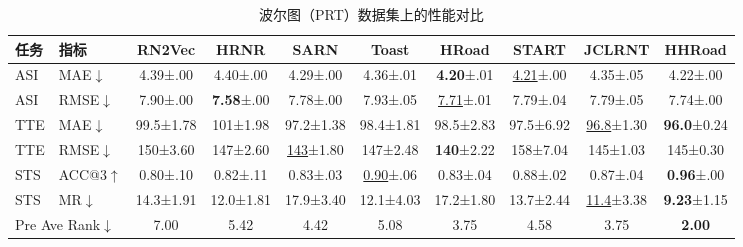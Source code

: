 \begin{table}[H]
    \centering
    \caption{波尔图（PRT）数据集上的性能对比}
    \label{tab:HHRoad_prt}
    \small
    \setlength{\tabcolsep}{3pt}
    \begin{tabular}{ll|cccccccc}
        \hline
        \textbf{任务} & \textbf{指标} & \textbf{RN2Vec} & \textbf{HRNR} & \textbf{SARN} & \textbf{Toast} & \textbf{HRoad} & \textbf{START} & \textbf{JCLRNT} & \textbf{HHRoad} \\
        \hline
        ASI & MAE$\downarrow$ & 4.39\tiny{±.00} & 4.40\tiny{±.00} & 4.29\tiny{±.00} & 4.36\tiny{±.01} & \textbf{4.20}\tiny{±.01} & \underline{4.21}\tiny{±.00} & 4.35\tiny{±.05} & 4.22\tiny{±.00} \\
        ASI & RMSE$\downarrow$ & 7.90\tiny{±.00} & \textbf{7.58}\tiny{±.00} & 7.78\tiny{±.00} & 7.93\tiny{±.05} & \underline{7.71}\tiny{±.01} & 7.79\tiny{±.04} & 7.79\tiny{±.05} & 7.74\tiny{±.00} \\
        TTE & MAE$\downarrow$ & 99.5\tiny{±1.78} & 101\tiny{±1.98} & 97.2\tiny{±1.38} & 98.4\tiny{±1.81} & 98.5\tiny{±2.83} & 97.5\tiny{±6.92} & \underline{96.8}\tiny{±1.30} & \textbf{96.0}\tiny{±0.24} \\
        TTE & RMSE$\downarrow$ & 150\tiny{±3.60} & 147\tiny{±2.60} & \underline{143}\tiny{±1.80} & 147\tiny{±2.48} & \textbf{140}\tiny{±2.22} & 158\tiny{±7.04} & 145\tiny{±1.03} & 145\tiny{±0.30} \\
        STS & ACC@3$\uparrow$ & 0.80\tiny{±.10} & 0.82\tiny{±.11} & 0.83\tiny{±.03} & \underline{0.90}\tiny{±.06} & 0.83\tiny{±.04} & 0.88\tiny{±.02} & 0.87\tiny{±.04} & \textbf{0.96}\tiny{±.00} \\
        STS & MR$\downarrow$ & 14.3\tiny{±1.91} & 12.0\tiny{±1.81} & 17.9\tiny{±3.40} & 12.1\tiny{±4.03} & 17.2\tiny{±1.80} & 13.7\tiny{±2.44} & \underline{11.4}\tiny{±3.38} & \textbf{9.23}\tiny{±1.15} \\
        \hline
        \multicolumn{2}{l|}{Pre Ave Rank$\downarrow$} & 7.00 & 5.42 & 4.42 & 5.08 & 3.75 & 4.58 & 3.75 & \textbf{2.00} \\
        \hline
    \end{tabular}
\end{table}

